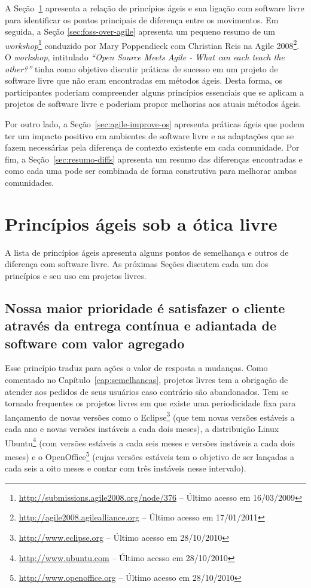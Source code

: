 A Seção~\ref{sec:principles} apresenta a relação de princípios ágeis e
sua ligação com software livre para identificar os pontos principais
de diferença entre os movimentos. Em seguida, a Seção
\ref{sec:foss-over-agile} apresenta um pequeno resumo de um
\textit{workshop}\footnote{\url{http://submissions.agile2008.org/node/376}
  -- Último acesso em 16/03/2009} conduzido por Mary Poppendieck com
Christian Reis na Agile
2008\footnote{\url{http://agile2008.agilealliance.org} -- Último
  acesso em 17/01/2011}. O \textit{workshop}, intitulado
\textit{``Open Source Meets Agile - What can each teach the other?''}
tinha como objetivo discutir práticas de sucesso em um projeto de
software livre que não eram encontradas em métodos ágeis. Desta forma,
os participantes poderiam compreender alguns princípios essenciais que
se aplicam a projetos de software livre e poderiam propor melhorias
aos atuais métodos ágeis.

Por outro lado, a Seção~\ref{sec:agile-improve-os} apresenta práticas
ágeis que podem ter um impacto positivo em ambientes de software livre
e as adaptações que se fazem necessárias pela diferença de contexto
existente em cada comunidade. Por fim, a Seção~\ref{sec:resumo-diffs}
apresenta um resumo das diferenças encontradas e como cada uma pode
ser combinada de forma construtiva para melhorar ambas comunidades.

\section{Princípios ágeis sob a ótica livre}
\label{sec:principles}

A lista de princípios ágeis apresenta alguns pontos de semelhança e
outros de diferença com software livre. As próximas Seções discutem
cada um dos princípios e seu uso em projetos livres.

\subsection[Satisfação do cliente]{Nossa maior prioridade é satisfazer
  o cliente através da entrega contínua e adiantada de software com
  valor agregado}

Esse princípio traduz para ações o valor de resposta a mudanças. Como
comentado no Capítulo~\ref{cap:semelhancas}, projetos livres tem a
obrigação de atender aos pedidos de seus usuários caso contrário são
abandonados. Tem se tornado frequentes os projetos livres em que
existe uma periodicidade fixa para lançamento de novas versões como o
Eclipse\footnote{\url{http://www.eclipse.org} -- Último acesso em
  28/10/2010} (que tem novas versões estáveis a cada ano e novas
versões instáveis a cada dois meses), a distribuição Linux
Ubuntu\footnote{\url{http://www.ubuntu.com} -- Último acesso em
  28/10/2010} (com versões estáveis a cada seis meses e versões
instáveis a cada dois meses) e o
OpenOffice\footnote{\url{http://www.openoffice.org} -- Último acesso
  em 28/10/2010} (cujas versões estáveis tem o objetivo de ser
lançadas a cada seis a oito meses e contar com três instáveis nesse
intervalo).

